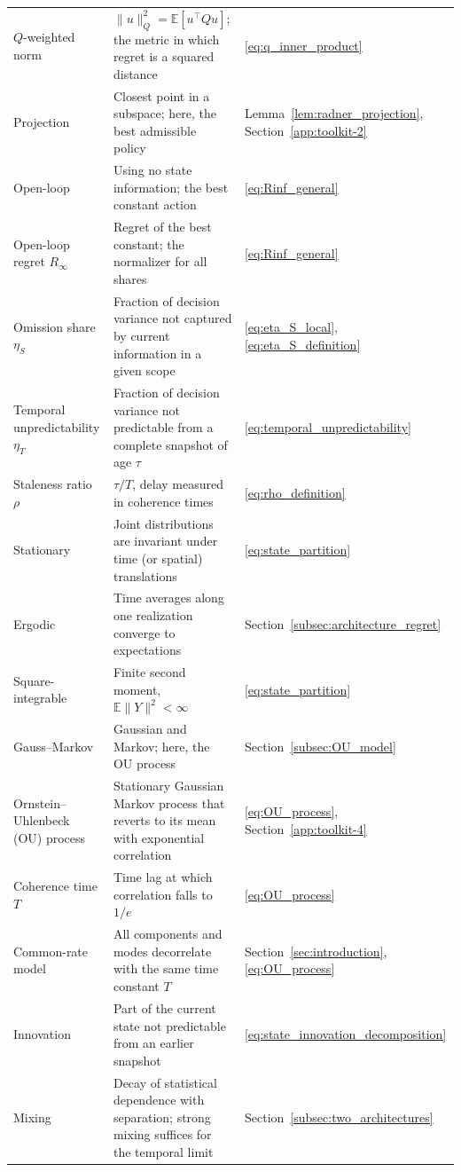 \begin{longtable}{@{}p{.23\linewidth}p{.52\linewidth}p{.20\linewidth}@{}}
$Q$-weighted norm & $\|u\|_Q^2=\mathbb E[u^\top Qu]$; the metric in which regret is a squared distance & \eqref{eq:q_inner_product} \\
Projection & Closest point in a subspace; here, the best admissible policy & Lemma~\ref{lem:radner_projection}, Section~\ref{app:toolkit-2} \\
Open-loop & Using no state information; the best constant action & \eqref{eq:Rinf_general} \\
Open-loop regret $R_\infty$ & Regret of the best constant; the normalizer for all shares & \eqref{eq:Rinf_general} \\
Omission share $\eta_S$ & Fraction of decision variance not captured by current information in a given scope & \eqref{eq:eta_S_local}, \eqref{eq:eta_S_definition} \\
Temporal unpredictability $\eta_T$ & Fraction of decision variance not predictable from a complete snapshot of age $\tau$ & \eqref{eq:temporal_unpredictability} \\
Staleness ratio $\rho$ & $\tau/T$, delay measured in coherence times & \eqref{eq:rho_definition} \\
Stationary & Joint distributions are invariant under time (or spatial) translations & \eqref{eq:state_partition} \\
Ergodic & Time averages along one realization converge to expectations & Section~\ref{subsec:architecture_regret} \\
Square-integrable & Finite second moment, $\mathbb E\|Y\|^2<\infty$ & \eqref{eq:state_partition} \\
Gauss--Markov & Gaussian and Markov; here, the OU process & Section~\ref{subsec:OU_model} \\
Ornstein--Uhlenbeck (OU) process & Stationary Gaussian Markov process that reverts to its mean with exponential correlation & \eqref{eq:OU_process}, Section~\ref{app:toolkit-4} \\
Coherence time $T$ & Time lag at which correlation falls to $1/e$ & \eqref{eq:OU_process} \\
Common-rate model & All components and modes decorrelate with the same time constant $T$ & Section~\ref{sec:introduction}, \eqref{eq:OU_process} \\
Innovation & Part of the current state not predictable from an earlier snapshot & \eqref{eq:state_innovation_decomposition} \\
Mixing & Decay of statistical dependence with separation; strong mixing suffices for the temporal limit & Section~\ref{subsec:two_architectures} \\

\end{longtable}
